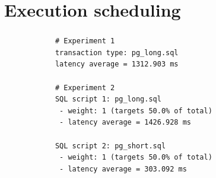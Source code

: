 \documentclass[usenames,dvipsnames, 18pt, compress, aspectratio=169]{beamer}
\begin{document}
\fontsize{13pt}{14}\selectfont
\section{Execution scheduling}
\fontsize{17pt}{18}\selectfont

\begin{frame}[fragile]{}
    \frametitle{}
    \begin{center}

        \begin{verbatim}
            # Experiment 1
            transaction type: pg_long.sql
            latency average = 1312.903 ms

            # Experiment 2
            SQL script 1: pg_long.sql
             - weight: 1 (targets 50.0% of total)
             - latency average = 1426.928 ms

            SQL script 2: pg_short.sql
             - weight: 1 (targets 50.0% of total)
             - latency average = 303.092 ms
        \end{verbatim}

    \end{center}
\end{frame}
\end{document}
